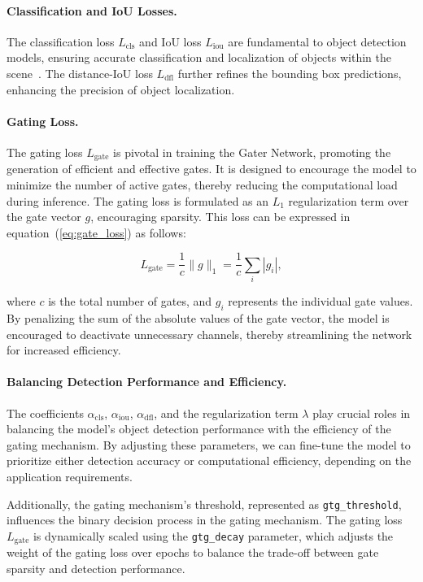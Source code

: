 \paragraph{Classification and IoU Losses.} The classification loss \(L_{\text{cls}}\) and IoU loss \(L_{\text{iou}}\) are fundamental to object detection models, ensuring accurate classification and localization of objects within the scene~\cite{li2023yolov6,li2022yolov6}. The distance-IoU loss \(L_{\text{dfl}}\) further refines the bounding box predictions, enhancing the precision of object localization.

\paragraph{Gating Loss.} The gating loss \(L_{\text{gate}}\) is pivotal in training the Gater Network, promoting the generation of efficient and effective gates. It is designed to encourage the model to minimize the number of active gates, thereby reducing the computational load during inference. The gating loss is formulated as an \(L_1\) regularization term over the gate vector \(g\), encouraging sparsity. This loss can be expressed in equation~(\ref{eq:gate_loss}) as follows:

\begin{equation}
L_{\text{gate}} = \frac{1}{c} \| g \|_1 = \frac{1}{c} \sum_{i} | g_i |,
\label{eq:gate_loss}
\end{equation}

where \(c\) is the total number of gates, and \(g_i\) represents the individual gate values. By penalizing the sum of the absolute values of the gate vector, the model is encouraged to deactivate unnecessary channels, thereby streamlining the network for increased efficiency.

\paragraph{Balancing Detection Performance and Efficiency.} The coefficients \(\alpha_{\text{cls}}\), \(\alpha_{\text{iou}}\), \(\alpha_{\text{dfl}}\), and the regularization term \(\lambda\) play crucial roles in balancing the model's object detection performance with the efficiency of the gating mechanism. By adjusting these parameters, we can fine-tune the model to prioritize either detection accuracy or computational efficiency, depending on the application requirements.

Additionally, the gating mechanism's threshold, represented as \texttt{gtg\_threshold}, influences the binary decision process in the gating mechanism. The gating loss \(L_{\text{gate}}\) is dynamically scaled using the \texttt{gtg\_decay} parameter, which adjusts the weight of the gating loss over epochs to balance the trade-off between gate sparsity and detection performance.


